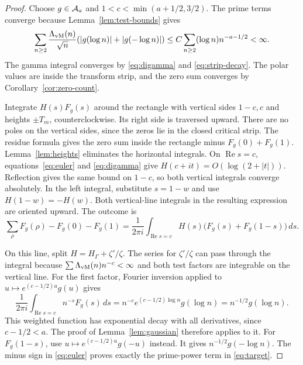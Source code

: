 \begin{proof}
Choose $g\in\mathcal A_a$ and $1<c<\min(a+1/2,3/2)$.
The prime terms converge because Lemma~\ref{lem:test-bounds} gives
\[
 \sum_{n\geq2}\frac{\Lambda_{\rm vM}(n)}{\sqrt n}
                    (|g(\log n)|+|g(-\log n)|)
 \leq C\sum_{n\geq2}(\log n)n^{-a-1/2}<\infty.
\]
The gamma integral converges by \eqref{eq:digamma} and
\eqref{eq:strip-decay}.  The polar values are inside the transform strip,
and the zero sum converges by Corollary~\ref{cor:zero-count}.

Integrate $H(s)F_g(s)$ around the rectangle with vertical sides $1-c,c$
and heights $\pm T_m$, counterclockwise.  Its right side is traversed upward.
There are no poles on the vertical sides, since the zeros lie in the
closed critical strip.
The residue formula gives the zero sum inside the rectangle minus
$F_g(0)+F_g(1)$.
Lemma~\ref{lem:heights} eliminates the horizontal integrals.
On $\operatorname{Re}s=c$, equations~\eqref{eq:euler} and
\eqref{eq:digamma} give $H(c+it)=O(\log(2+|t|))$.
Reflection gives the same bound on $1-c$, so both vertical integrals
converge absolutely.
In the left integral, substitute $s=1-w$ and use $H(1-w)=-H(w)$.
Both vertical-line integrals in the resulting expression are oriented upward.
The outcome is
\begin{equation}
 \sum_\rho F_g(\rho)-F_g(0)-F_g(1)
 =\frac1{2\pi i}\int_{\operatorname{Re}s=c}
           H(s)\bigl(F_g(s)+F_g(1-s)\bigr)\,ds.
 \label{eq:spine-contour}
\end{equation}

On this line, split $H=H_\Gamma+\zeta'/\zeta$.
The series for $\zeta'/\zeta$ can pass through the integral because
$\sum\Lambda_{\rm vM}(n)n^{-c}<\infty$ and both test factors are integrable
on the vertical line.
For the first factor, Fourier inversion applied to
$u\mapsto e^{(c-1/2)u}g(u)$ gives
\begin{equation}
 \frac1{2\pi i}\int_{\operatorname{Re}s=c}n^{-s}F_g(s)\,ds
 =n^{-c}e^{(c-1/2)\log n}g(\log n)
 =n^{-1/2}g(\log n).
 \label{eq:prime-inversion}
\end{equation}
This weighted function has exponential decay with all derivatives, since
$c-1/2<a$.  The proof of Lemma~\ref{lem:gaussian} therefore applies to it.
For $F_g(1-s)$, use $u\mapsto e^{(c-1/2)u}g(-u)$ instead.
It gives $n^{-1/2}g(-\log n)$.
The minus sign in \eqref{eq:euler} proves exactly the prime-power term in
\eqref{eq:target}.


\end{proof}
